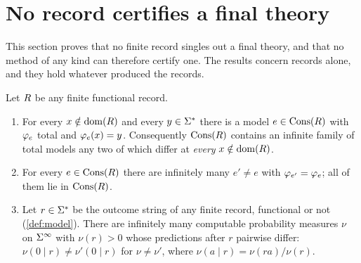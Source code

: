 \section{No record certifies a final theory}\label{sec:certify}

This section proves that no finite record singles out a final theory, and that no
method of any kind can therefore certify one. The results concern records alone, and
they hold whatever produced the records.

\begin{theorem}\label{thm:ud-infinite}
Let $R$ be any finite functional record.
\begin{enumerate}[label=(\alph*)]
  \item\label{ud:item-a} For every $x\notin\operatorname{dom}(R)$ and every $y\in\Sigma^{*}$ there is a
        model $e\in\operatorname{Cons}(R)$ with $\varphi_{e}$ total and $\varphi_{e}(x)=y$. Consequently
        $\operatorname{Cons}(R)$ contains an infinite family of total models any two of which
        differ at \emph{every} $x\notin\operatorname{dom}(R)$.
  \item\label{ud:item-b} For every $e\in\operatorname{Cons}(R)$ there are infinitely many
        $e'\ne e$ with $\varphi_{e'}=\varphi_{e}$; all of them lie in $\operatorname{Cons}(R)$.
  \item\label{ud:item-c} Let $r\in\Sigma^{*}$ be the outcome string of any finite record,
        functional or not (\cref{def:model}). There are infinitely many computable
        probability measures $\nu$ on $\Sigma^{\infty}$ with $\nu(r)>0$ whose predictions after
        $r$ pairwise differ: $\nu(0\mid r)\ne\nu'(0\mid r)$ for $\nu\ne\nu'$, where
        $\nu(a\mid r)=\nu(ra)/\nu(r)$.
\end{enumerate}
\end{theorem}

